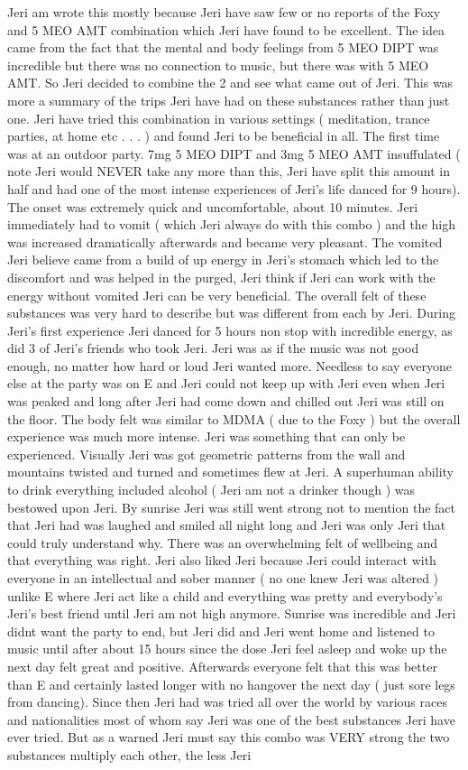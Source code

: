 \documentclass[12pt]{book}
\begin{document}
Jeri am wrote this mostly because Jeri have saw few or no reports of the Foxy and 5 MEO AMT combination which Jeri have found to be excellent. The idea came from the fact that the mental and body feelings from 5 MEO DIPT was incredible but there was no connection to music, but there was with 5 MEO AMT. So Jeri decided to combine the 2 and see what came out of Jeri. This was more a summary of the trips Jeri have had on these substances rather than just one. Jeri have tried this combination in various settings ( meditation, trance parties, at home etc . . .   ) and found Jeri to be beneficial in all. The first time was at an outdoor party. 7mg 5 MEO DIPT and 3mg 5 MEO AMT insuffulated ( note Jeri would NEVER take any more than this, Jeri have split this amount in half and had one of the most intense experiences of Jeri's life danced for 9 hours). The onset was extremely quick and uncomfortable, about 10 minutes. Jeri immediately had to vomit ( which Jeri always do with this combo ) and the high was increased dramatically afterwards and became very pleasant. The vomited Jeri believe came from a build of up energy in Jeri's stomach which led to the discomfort and was helped in the purged, Jeri think if Jeri can work with the energy without vomited Jeri can be very beneficial. The overall felt of these substances was very hard to describe but was different from each by Jeri. During Jeri's first experience Jeri danced for 5 hours non stop with incredible energy, as did 3 of Jeri's friends who took Jeri. Jeri was as if the music was not good enough, no matter how hard or loud Jeri wanted more. Needless to say everyone else at the party was on E and Jeri could not keep up with Jeri even when Jeri was peaked and long after Jeri had come down and chilled out Jeri was still on the floor. The body felt was similar to MDMA ( due to the Foxy ) but the overall experience was much more intense. Jeri was something that can only be experienced. Visually Jeri was got geometric patterns from the wall and mountains twisted and turned and sometimes flew at Jeri. A superhuman ability to drink everything included alcohol ( Jeri am not a drinker though ) was bestowed upon Jeri. By sunrise Jeri was still went strong not to mention the fact that Jeri had was laughed and smiled all night long and Jeri was only Jeri that could truly understand why. There was an overwhelming felt of wellbeing and that everything was right. Jeri also liked Jeri because Jeri could interact with everyone in an intellectual and sober manner ( no one knew Jeri was altered ) unlike E where Jeri act like a child and everything was pretty and everybody's Jeri's best friend until Jeri am not high anymore. Sunrise was incredible and Jeri didnt want the party to end, but Jeri did and Jeri went home and listened to music until after about 15 hours since the dose Jeri feel asleep and woke up the next day felt great and positive. Afterwards everyone felt that this was better than E and certainly lasted longer with no hangover the next day ( just sore legs from dancing). Since then Jeri had was tried all over the world by various races and nationalities most of whom say Jeri was one of the best substances Jeri have ever tried. But as a warned Jeri must say this combo was VERY strong the two substances multiply each other, the less Jeri 
\end{document}
